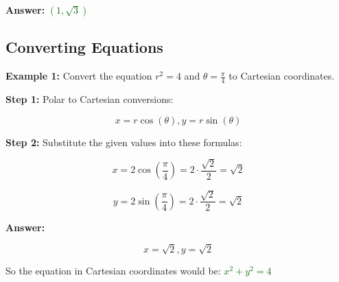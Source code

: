 \documentclass[10pt]{article}                               %
\begin{document}
\begin{adjustwidth}{2em}{0pt}
\begin{adjustwidth}{2em}{0pt}
\begin{examplebox}
\begin{adjustwidth}{2em}{0pt}
                \textbf{Answer:} \textcolor{darkgreen}{\( \left(1,\sqrt{3}\right) \)}

            \end{adjustwidth}

        \end{examplebox}

        \break

        \begin{examplebox}
        
            \subsection*{Converting Equations}

            \textbf{Example 1:} Convert the equation \( r^2 = 4 \) and \( \theta = \frac{\pi}{4} \) to Cartesian coordinates.
            \vspace{0.5em}

            \begin{adjustwidth}{2em}{0pt}

                \textbf{Step 1:} Polar to Cartesian conversions:

                \vspace{0.25em}

                \[ x = r\cos(\theta), y = r\sin(\theta) \]

                \vspace{0.5em}

                \textbf{Step 2:} Substitute the given values into these formulas:

                \vspace{0.25em}

                \[ x = 2\cos\left(\frac{\pi}{4}\right) = 2 \cdot \frac{\sqrt{2}}{2} = \sqrt{2} \]

                \[ y = 2\sin\left(\frac{\pi}{4}\right) = 2 \cdot \frac{\sqrt{2}}{2} = \sqrt{2} \]

                \vspace{0.5em}

                \textbf{Answer:}

                \vspace{0.25em}

                \[ x = \sqrt{2}, y = \sqrt{2} \]

                \vspace{0.5em}

                So the equation in Cartesian coordinates would be:
                \textcolor{darkgreen}{\( x^2 + y^2 = 4 \)}


\end{adjustwidth}
\end{examplebox}
\end{adjustwidth}
\end{adjustwidth}
\end{document}
